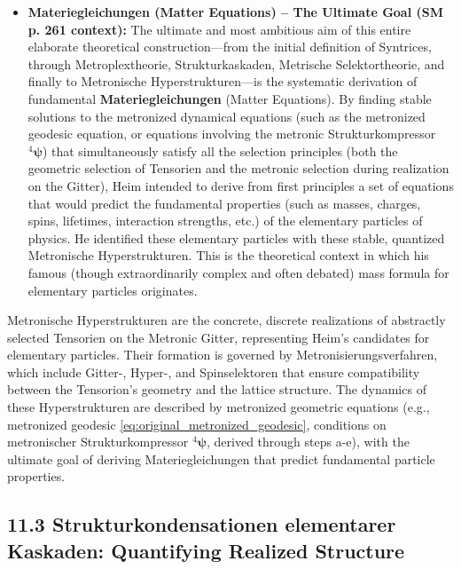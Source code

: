 \documentclass[12pt]{article}
\newcommand{\metronischerstrukturkompressor}{{}^4\bm{\psi}} %
\begin{document}
\begin{itemize}
    \item \textbf{Materiegleichungen (Matter Equations) – The Ultimate Goal (SM p. 261 context):}
    The ultimate and most ambitious aim of this entire elaborate theoretical construction—from the initial definition of Syntrices, through Metroplextheorie, Strukturkaskaden, Metrische Selektortheorie, and finally to Metronische Hyperstrukturen—is the systematic derivation of fundamental \textbf{Materiegleichungen} (Matter Equations). By finding stable solutions to the metronized dynamical equations (such as the metronized geodesic equation, or equations involving the metronic Strukturkompressor \( \metronischerstrukturkompressor \)) that simultaneously satisfy all the selection principles (both the geometric selection of Tensorien and the metronic selection during realization on the Gitter), Heim intended to derive from first principles a set of equations that would predict the fundamental properties (such as masses, charges, spins, lifetimes, interaction strengths, etc.) of the elementary particles of physics. He identified these elementary particles with these stable, quantized Metronische Hyperstrukturen. This is the theoretical context in which his famous (though extraordinarily complex and often debated) mass formula for elementary particles originates.
\end{itemize}

Metronische Hyperstrukturen are the concrete, discrete realizations of abstractly selected Tensorien on the Metronic Gitter, representing Heim's candidates for elementary particles. Their formation is governed by Metronisierungsverfahren, which include Gitter-, Hyper-, and Spinselektoren that ensure compatibility between the Tensorion's geometry and the lattice structure. The dynamics of these Hyperstrukturen are described by metronized geometric equations (e.g., metronized geodesic \eqref{eq:original_metronized_geodesic}, conditions on metronischer Strukturkompressor \(\metronischerstrukturkompressor\), derived through steps a-e), with the ultimate goal of deriving Materiegleichungen that predict fundamental particle properties.

\subsection{11.3 Strukturkondensationen elementarer Kaskaden: Quantifying Realized Structure}
\label{sec:strukturkondensation}
\end{document}
